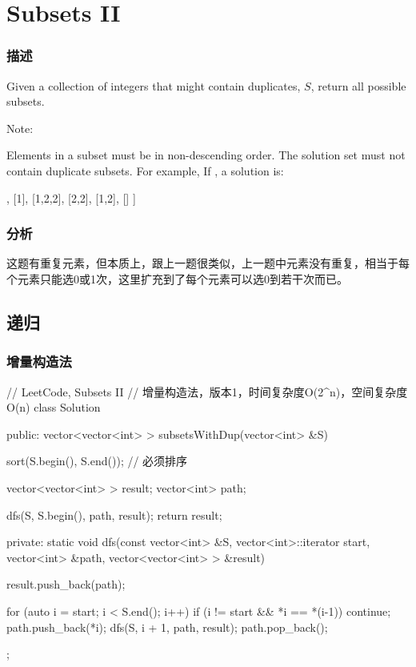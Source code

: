 \section{Subsets II} %
\label{sec:subsets-ii}


\subsubsection{描述}
Given a collection of integers that might contain duplicates, $S$, return all possible subsets.

Note:

Elements in a subset must be in non-descending order.
The solution set must not contain duplicate subsets.
For example,
If , a solution is:
\begin{Code}
[
  [2],
  [1],
  [1,2,2],
  [2,2],
  [1,2],
  []
]
\end{Code}


\subsubsection{分析}
这题有重复元素，但本质上，跟上一题很类似，上一题中元素没有重复，相当于每个元素只能选0或1次，这里扩充到了每个元素可以选0到若干次而已。


\subsection{递归}


\subsubsection{增量构造法}
\begin{Code}
// LeetCode, Subsets II
// 增量构造法，版本1，时间复杂度O(2^n)，空间复杂度O(n)
class Solution {
public:
    vector<vector<int> > subsetsWithDup(vector<int> &S) {
        sort(S.begin(), S.end());  // 必须排序

        vector<vector<int> > result;
        vector<int> path;

        dfs(S, S.begin(), path, result);
        return result;
    }

private:
    static void dfs(const vector<int> &S, vector<int>::iterator start,
            vector<int> &path, vector<vector<int> > &result) {
        result.push_back(path);

        for (auto i = start; i < S.end(); i++) {
            if (i != start && *i == *(i-1)) continue;
            path.push_back(*i);
            dfs(S, i + 1, path, result);
            path.pop_back();
        }
    }
};
\end{Code}

